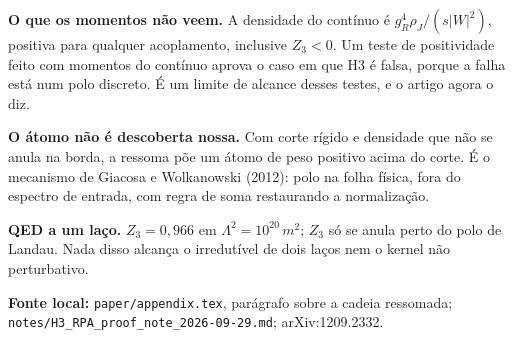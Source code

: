 \documentclass[11pt,a4paper]{article}
\newcommand{\source}[1]{\vfill{\footnotesize\raggedright\color{ink}\textbf{Fonte local:} #1\par}}
\begin{document}
\textbf{O que os momentos não veem.} A densidade do contínuo é
$g_R^4\rho_J/(s|W|^2)$, positiva para qualquer acoplamento, inclusive
$Z_3<0$. Um teste de positividade feito com momentos do contínuo aprova o
caso em que H3 é falsa, porque a falha está num polo discreto. É um limite
de alcance desses testes, e o artigo agora o diz.

\textbf{O átomo não é descoberta nossa.} Com corte rígido e densidade que
não se anula na borda, a ressoma põe um átomo de peso positivo acima do
corte. É o mecanismo de Giacosa e Wolkanowski (2012): polo na folha física,
fora do espectro de entrada, com regra de soma restaurando a normalização.

\textbf{QED a um laço.} $Z_3=0{,}966$ em $\Lambda^2=10^{20}\,m^2$; $Z_3$ só se
anula perto do polo de Landau. Nada disso alcança o irredutível de dois
laços nem o kernel não perturbativo.
\source{\texttt{paper/appendix.tex}, parágrafo sobre a cadeia ressomada;
\texttt{notes/H3\_RPA\_proof\_note\_2026-09-29.md}; arXiv:1209.2332.}
\end{document}
